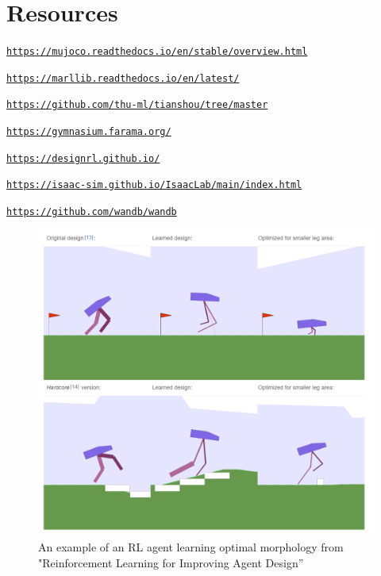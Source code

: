 \documentclass{article}
\begin{document}
\section*{Resources}

\href{https://mujoco.readthedocs.io/en/stable/overview.html}{\texttt{https://mujoco.readthedocs.io/en/stable/overview.html}}

\noindent
\href{https://marllib.readthedocs.io/en/latest/}{\texttt{https://marllib.readthedocs.io/en/latest/}}

\noindent
\href{https://github.com/thu-ml/tianshou/tree/master}{\texttt{https://github.com/thu-ml/tianshou/tree/master}}

\noindent
\href{https://gymnasium.farama.org/}{\texttt{https://gymnasium.farama.org/}}

\noindent
\href{https://designrl.github.io/}{\texttt{https://designrl.github.io/}}

\noindent
\href{https://isaac-sim.github.io/IsaacLab/main/index.html}{\texttt{https://isaac-sim.github.io/IsaacLab/main/index.html}}

\noindent
\href{https://github.com/wandb/wandb}{\texttt{https://github.com/wandb/wandb}}



\vspace{0.25in}
\begin{figure}[htbp]
  \centering
  \includegraphics[width=0.4\linewidth]{../figures/biped.png}  %
  \caption{An example of an RL agent learning optimal morphology from "Reinforcement Learning for Improving Agent Design”}
  \label{fig:rl-agent}
\end{figure}
\end{document}
